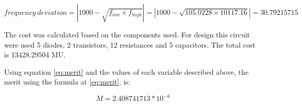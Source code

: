 \newpage
\begin{equation}
    frequency\:deviation =\left | 1000 - \sqrt{f_{low} \times  f_{high}} \right |=\left | 1000 - \sqrt{105.0228 \times 10117.16} \right |=30.79215715
    \label{eq:freq}
\end{equation}


The cost was calculated based on the components used. For design this circuit were used 5 diodes, 2 transistors, 12 resistances and 5 capacitors. The total cost is 13428.29504 MU.

Using equation \ref{eq:merit} and the values of each variable described above, the merit using the formula at \ref{eq:merit}, is:

\begin{equation}
    M = 2.408741713 * 10^{-6}
    \label{eq:meritf}
\end{equation}


















